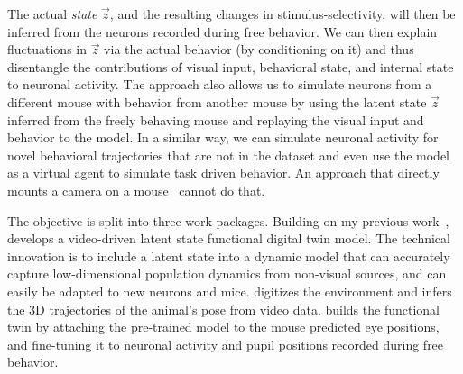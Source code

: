 \documentclass[B2,COG]{ercgrant}
\begin{document}
The actual \textit{state} $\vec{z}$, and the resulting changes in stimulus-selectivity, will then be inferred from the neurons recorded during free behavior. We can then explain fluctuations in $\vec{z}$ via the actual behavior (by conditioning on it) and thus disentangle the contributions of visual input, behavioral state, and internal state to neuronal activity. 
 The approach also allows us to simulate neurons from a different mouse with behavior from another mouse by using the latent state $\vec{z}$ inferred from the freely behaving mouse and replaying the visual input and behavior to the model. 
 In a similar way, we can simulate neuronal activity for novel behavioral trajectories that are not in the dataset and even use the model as a virtual agent to simulate task driven behavior. An approach that directly mounts a camera on a mouse~\parencite{Parker2022-ac} cannot do that. 


The objective is split into three work packages. 
Building on my previous work~\parencite{Sinz2018-sk, Bashiri2021-or},  develops a video-driven latent state functional digital twin model. 
The technical innovation is to include a latent state into a dynamic model that can accurately capture low-dimensional population dynamics from non-visual sources, and can easily be adapted to new neurons and mice. 
 digitizes the environment and infers the 3D trajectories of the animal's pose from video data.
 builds the functional twin by attaching the pre-trained model to the mouse predicted eye positions, and fine-tuning it to neuronal activity and pupil positions recorded during free behavior.


\end{document}

